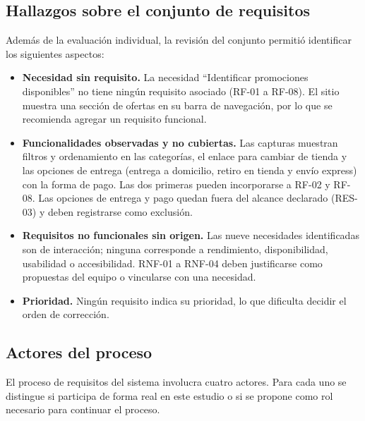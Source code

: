 \documentclass[12pt,a4paper]{article}
\renewcommand{\arraystretch}{1.17}
\begin{document}
\subsection{Hallazgos sobre el conjunto de requisitos}

Además de la evaluación individual, la revisión del conjunto
permitió identificar los siguientes aspectos:

\begin{itemize}
    \item \textbf{Necesidad sin requisito.} La necesidad
    ``Identificar promociones disponibles'' no tiene ningún
    requisito asociado (RF-01 a RF-08). El sitio muestra una
    sección de ofertas en su barra de navegación, por lo que
    se recomienda agregar un requisito funcional.
    \item \textbf{Funcionalidades observadas y no cubiertas.}
    Las capturas muestran filtros y ordenamiento en las categorías,
    el enlace para cambiar de tienda y las opciones de entrega
    (entrega a domicilio, retiro en tienda y envío express) con la
    forma de pago. Las dos primeras pueden incorporarse a RF-02 y
    RF-08. Las opciones de entrega y pago quedan fuera del alcance
    declarado (RES-03) y deben registrarse como exclusión.
    \item \textbf{Requisitos no funcionales sin origen.} Las nueve
    necesidades identificadas son de interacción; ninguna
    corresponde a rendimiento, disponibilidad, usabilidad o
    accesibilidad. RNF-01 a RNF-04 deben justificarse como
    propuestas del equipo o vincularse con una necesidad.
    \item \textbf{Prioridad.} Ningún requisito indica su
    prioridad, lo que dificulta decidir el orden de corrección.
\end{itemize}

\subsection{Actores del proceso}

El proceso de requisitos del sistema involucra cuatro actores.
Para cada uno se distingue si participa de forma real en este
estudio o si se propone como rol necesario para continuar el
proceso.

\begingroup
\footnotesize
\setlength{\tabcolsep}{2.5pt}
\renewcommand{\arraystretch}{1.15}
\end{document}
